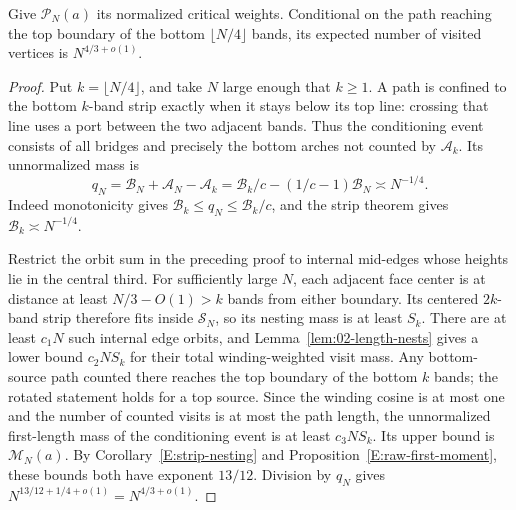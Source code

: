 \begin{proposition}
\label{prop:02-length-reduction}
Give \(\mathcal P_N(a)\) its normalized critical weights. Conditional
on the path reaching the top boundary of the bottom
\(\lfloor N/4\rfloor\) bands, its
expected number of visited vertices is \(N^{4/3+o(1)}\).
\end{proposition}
\begin{proof}
Put \(k=\lfloor N/4\rfloor\), and take \(N\) large enough that
\(k\ge1\). A path is confined to the bottom \(k\)-band strip exactly
when it stays below its top line: crossing that line uses a port between
the two adjacent bands. Thus the conditioning event consists of all
bridges and precisely the bottom arches not counted by \(\mathcal A_k\).
Its unnormalized mass is
\[
 q_N=\mathcal B_N+\mathcal A_N-\mathcal A_k
     =\mathcal B_k/c-(1/c-1)\mathcal B_N
     \asymp N^{-1/4}.
\]
Indeed monotonicity gives
\(\mathcal B_k\le q_N\le\mathcal B_k/c\), and the strip theorem gives
\(\mathcal B_k\asymp N^{-1/4}\).

Restrict the orbit sum in the preceding proof to internal mid-edges
whose heights lie in the central third. For sufficiently large \(N\),
each adjacent face center is at distance at least \(N/3-O(1)>k\)
bands from either boundary. Its centered \(2k\)-band strip therefore
fits inside \(\mathcal S_N\), so its nesting mass is at least \(S_k\).
There are at least \(c_1N\) such internal edge orbits, and
Lemma~\ref{lem:02-length-nests} gives a lower bound \(c_2NS_k\) for
their total winding-weighted visit mass. Any bottom-source path counted
there reaches the top boundary of the bottom \(k\) bands; the rotated statement holds
for a top source. Since the winding cosine is at most one and the
number of counted visits is at most the path length, the unnormalized
first-length mass of the conditioning event is at least \(c_3NS_k\).
Its upper bound is \(\mathcal M_N(a)\). By
Corollary~\ref{E:strip-nesting} and
Proposition~\ref{E:raw-first-moment}, these bounds both have exponent
\(13/12\). Division by \(q_N\) gives
\(N^{13/12+1/4+o(1)}=N^{4/3+o(1)}\).
\end{proof}
